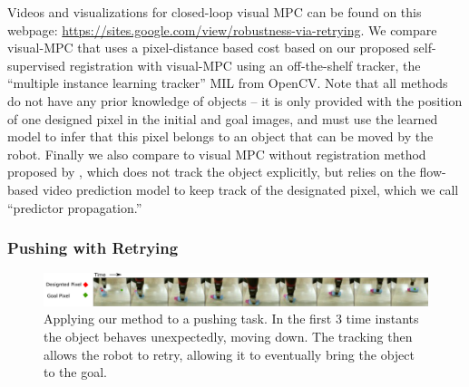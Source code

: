 Videos and visualizations for closed-loop visual MPC can be found on this webpage: \url{https://sites.google.com/view/robustness-via-retrying}.
We compare visual-MPC that uses a pixel-distance based cost based on our proposed self-supervised registration with visual-MPC using an off-the-shelf tracker, the ``multiple instance learning tracker'' MIL \cite{babenko2009visual} from OpenCV. Note that all methods do not have any prior knowledge of objects -- it is only provided with the position of one designed pixel in the initial and goal images, and must use the learned model to infer that this pixel belongs to an object that can be moved by the robot.
Finally we also compare to visual MPC without registration method proposed by \cite{sna},
which does not track the object explicitly, but relies on the flow-based video prediction model to keep track of the designated pixel, which we call ``predictor propagation.'' 

\subsubsection{Pushing with Retrying}

\begin{figure}
    \centering
    \includegraphics[width=1.0\textwidth]{images_rfr/push_correction.pdf}
    \caption{\small{Applying our method to a pushing task. In the first 3 time instants the object behaves unexpectedly, moving down. The tracking then allows the robot to retry, allowing it to eventually bring the object to the goal.}}
    \label{fig:push_retry}
\end{figure}



